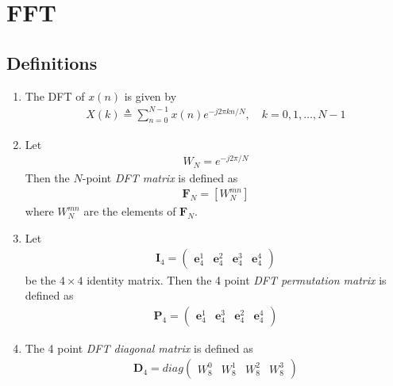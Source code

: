 \documentclass[journal,12pt,twocolumn]{IEEEtran}
\providecommand{\sbrak}[1]{\ensuremath{\left[#1\right]}}
\let\vec\mathbf
\numberwithin{equation}{section}
\renewcommand\thesection{\arabic{section}}
\newcommand{\myvec}[1]{\ensuremath{\begin{pmatrix}#1\end{pmatrix}}}
\begin{document}
	\section{FFT}	
	\subsection{Definitions}
\begin{enumerate}[label=\arabic*.,ref=\thesection.\theenumi]
    \item The DFT of $x(n)$ is given by
    \begin{align}
        X(k) \triangleq \sum_{n=0}^{N-1} x(n) e^{-j 2 \pi k n / N}, \quad k=0,1, \ldots, N-1
    \end{align}
\item Let 
	\begin{align}
W_{N} = e^{-j2\pi/N} 
	\end{align}
		Then the $N$-point {\em DFT matrix} is defined as 
	\begin{align}
		\vec{F}_{N} = \sbrak{W_{N}^{mn}}
	\end{align}
	where $W_{N}^{mn}$ are the elements of $\vec{F}_{N}$.
\item Let 
	\begin{align}
		\vec{I}_4 = \myvec{\vec{e}_4^{1} &\vec{e}_4^{2} &\vec{e}_4^{3} &\vec{e}_4^{4} }
	\end{align}
		be the $4\times 4$ identity matrix.  Then the 4 point {\em DFT permutation matrix} is defined as 
	\begin{align}
		\vec{P}_4 = \myvec{\vec{e}_4^{1} &\vec{e}_4^{3} &\vec{e}_4^{2} &\vec{e}_4^{4} }
	\end{align}
\item The 4 point {\em DFT diagonal matrix} is defined as 
	\begin{align}
		\vec{D}_4 = diag\myvec{W_{8}^{0} & W_{8}^{1} & W_{8}^{2} & W_{8}^{3}}
	\end{align}
 \end{enumerate}
\end{document}
